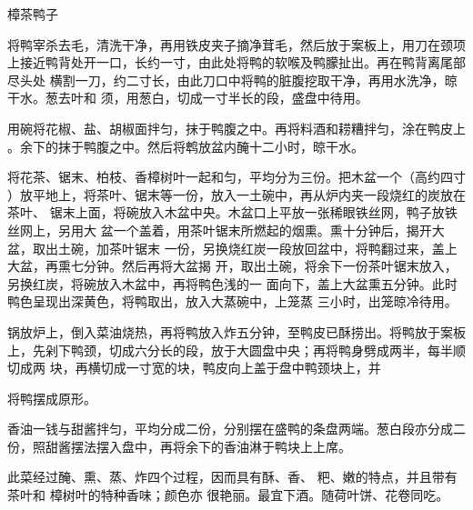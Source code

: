 \begin{recipe}{樟茶鸭子}

\ingredients


\preparation

\step 将鸭宰杀去毛，清洗干净，再用铁皮夹子摘净茸毛，然后放于案板上，用刀在颈项
上接近鸭背处开一口，长约一寸，由此处将鸭的软喉及鸭朦扯出。再在鸭背离尾部尽头处
横割一刀，约二寸长，由此刀口中将鸭的脏腹挖取干净，再用水洗净，晾干水。葱去叶和
须，用葱白，切成一寸半长的段，盛盘中待用。

\step 用碗将花椒、盐、胡椒面拌匀，抹于鸭腹之中。再将料酒和耢糟拌匀，涂在鸭皮上
。余下的抹于鸭腹之中。然后将鹎放盆内醃十二小时，晾干水。

\step 将花茶、锯末、柏枝、香樟树叶一起和匀，平均分为三份。把木盆一个（高约四寸
）放平地上，将茶叶、锯末等一份，放入一土碗中，再从炉内夹一段烧红的炭放在茶叶、
锯末上面，将碗放入木盆中央。木盆口上平放一张稀眼铁丝网，鸭子放铁丝网上，另用大
盆一个盖着，用茶叶锯末所燃起的烟熏。熏十分钟后，揭开大盆，取出土碗，加茶叶锯末
一份，另换烧红炭一段放回盆中，将鸭翻过来，盖上大盆，再熏七分钟。然后再将大盆揭
开，取出土碗，将余下一份茶叶锯末放入，另换红炭，将碗放入木盆中，再将鸭色浅的一
面向下，盖上大盆熏五分钟。此时鸭色呈现出深黄色，将鸭取出，放入大蒸碗中，上笼蒸
三小时，出笼晾冷待用。

\step 锅放炉上，倒入菜油烧热，再将鸭放入炸五分钟，至鸭皮已酥捞出。将鸭放于案板
上，先剁下鸭颈，切成六分长的段，放于大圆盘中央；再将鸭身劈成两半，每半顺切成两
块，再横切成一寸宽的块，鸭皮向上盖于盘中鸭颈块上，并

将鸭摆成原形。

\step 香油一钱与甜酱拌匀，平均分成二份，分别摆在盛鸭的条盘两端。葱白段亦分成二
份，照甜酱摆法摆入盘中，再将余下的香油淋于鸭块上上席。

\features

此菜经过醃、熏、蒸、炸四个过程，因而具有酥、香、 粑、嫩的特点，并且带有茶叶和
樟树叶的特种香味；颜色亦 很艳丽。最宜下酒。随荷叶饼、花卷同吃。

\end{recipe}

